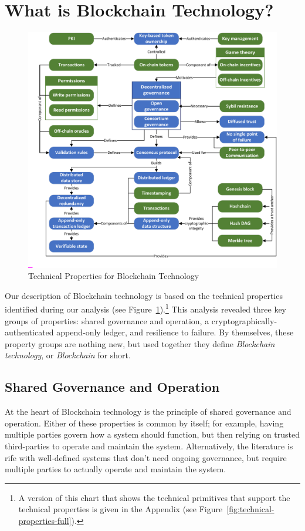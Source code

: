 
\section{What is Blockchain Technology?}
\begin{figure}
	\centering
	\includegraphics[page=2,width=\columnwidth]{figures/grounded-theory-main}
	
	\caption{Technical Properties for Blockchain Technology}
	\label{fig:technical-properties}
\end{figure}

\label{sec:blockchain}
Our description of Blockchain technology is based on the technical properties identified during our analysis (see Figure~\ref{fig:technical-properties}).\footnote{A version of this chart that shows the technical primitives that support the technical properties is given in the Appendix (see Figure~\ref{fig:technical-properties-full}).}
This analysis revealed three key groups of properties: shared governance and operation, a cryptographically-authenticated append-only ledger, and resilience to failure.
By themselves, these property groups are nothing new, but used together they define \emph{Blockchain technology}, or \emph{Blockchain} for short.

\subsection{Shared Governance and Operation}
At the heart of Blockchain technology is the principle of shared governance and operation.
Either of these properties is common by itself; for example, having multiple parties govern how a system should function, but then relying on trusted third-parties to operate and maintain the system.
Alternatively, the literature is rife with well-defined systems that don't need ongoing governance, but require multiple parties to actually operate and maintain the system.

